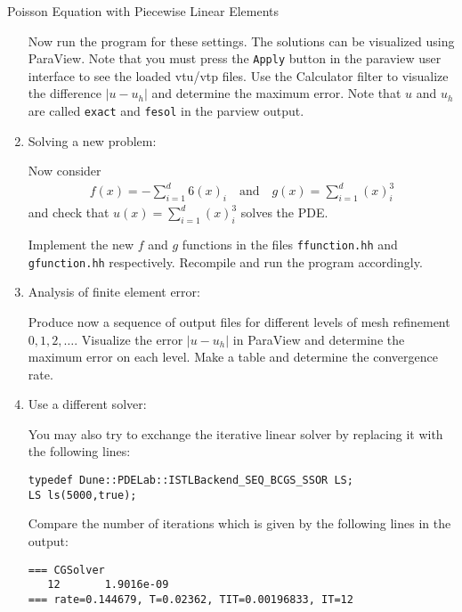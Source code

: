 \documentclass[12pt,a4paper]{article}
\begin{document}
\begin{Exercise}{Poisson Equation with Piecewise Linear Elements}
\begin{enumerate}
  Now run the program for these settings. The solutions can be
  visualized using ParaView.  Note that you must press the
  \lstinline{Apply} button in the paraview user interface to see the
  loaded vtu/vtp files.  Use the Calculator filter to visualize the
  difference $|u-u_h|$ and determine the maximum error. Note that $u$
  and $u_h$ are called \lstinline{exact} and \lstinline{fesol} in
  the parview output.

\item {\sc Solving a new problem}:

  Now consider
  \begin{align}
    f(x) =  -\sum_{i=1}^d 6(x)_i \quad\text{and}\quad  g(x) = \sum_{i=1}^d (x)_i^3
  \end{align}
  and check that $u(x)=\sum_{i=1}^d (x)_i^3$ solves the PDE.

  Implement the new $f$ and $g$ functions in the files
  \lstinline{ffunction.hh} and \lstinline{gfunction.hh}
  respectively. Recompile and run the program accordingly.

\item {\sc Analysis of finite element error}:

  Produce now a sequence of output files for different levels of mesh
  refinement $0, 1, 2, \ldots$. Visualize the error $|u-u_h|$ in
  ParaView and determine the maximum error on each level.  Make a
  table and determine the convergence rate.

\item {\sc Use a different solver}:

You may also try to exchange the iterative linear solver by
replacing it with the following lines:
\begin{lstlisting}
typedef Dune::PDELab::ISTLBackend_SEQ_BCGS_SSOR LS;
LS ls(5000,true);
\end{lstlisting}
Compare the number of iterations which is given by the
following lines in the output:
\begin{lstlisting}
=== CGSolver
   12       1.9016e-09
=== rate=0.144679, T=0.02362, TIT=0.00196833, IT=12
\end{lstlisting}
\end{enumerate}
\end{Exercise}
\end{document}
